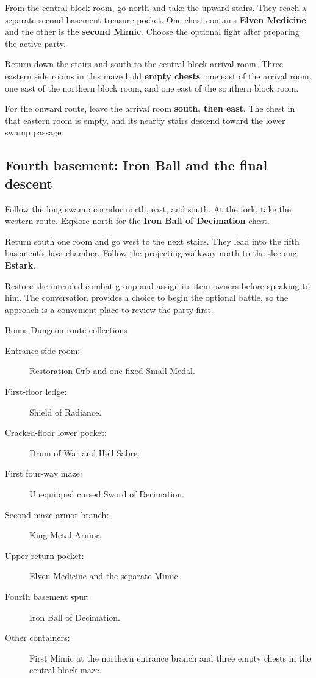 From the central-block room, go north and take the
upward stairs. They reach a separate second-basement
treasure pocket. One chest contains \textbf{Elven Medicine}
and the other is the \textbf{second Mimic}. Choose the
optional fight after preparing the active party.

Return down the stairs and south to the central-block
arrival room. Three eastern side rooms in this maze
hold \textbf{empty chests}: one east of the arrival
room, one east of the northern block room, and one
east of the southern block room.

For the onward route, leave the arrival room
\textbf{south, then east}. The chest in that eastern
room is empty, and its nearby stairs descend toward
the lower swamp passage.

\subsection*{Fourth basement: Iron Ball and the final descent}

Follow the long swamp corridor north, east, and south.
At the fork, take the western route. Explore north
for the \textbf{Iron Ball of Decimation} chest.

Return south one room and go west to the next stairs.
They lead into the fifth basement's lava chamber.
Follow the projecting walkway north to the sleeping
\textbf{Estark}.

Restore the intended combat group and assign its item
owners before speaking to him. The conversation provides
a choice to begin the optional battle, so the approach
is a convenient place to review the party first.

\begin{routecheck}{Bonus Dungeon route collections}
\begin{description}
  \item[Entrance side room:] Restoration Orb and one fixed Small Medal.
  \item[First-floor ledge:] Shield of Radiance.
  \item[Cracked-floor lower pocket:] Drum of War and Hell Sabre.
  \item[First four-way maze:] Unequipped cursed Sword of Decimation.
  \item[Second maze armor branch:] King Metal Armor.
  \item[Upper return pocket:] Elven Medicine and the separate Mimic.
  \item[Fourth basement spur:] Iron Ball of Decimation.
  \item[Other containers:] First Mimic at the northern entrance
    branch and three empty chests in the central-block maze.
\end{description}
\end{routecheck}

